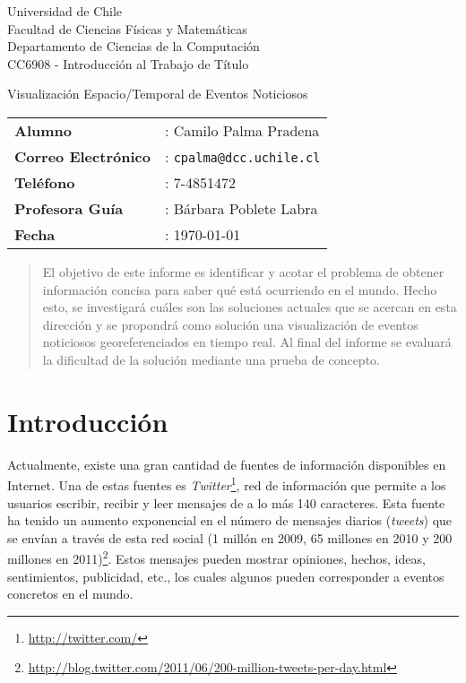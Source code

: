 \documentclass[10pt]{article}
\begin{document}
	\begin{titlepage}
	\begin{minipage}{12cm}
	\begin{flushleft}
	Universidad de Chile\\
	Facultad de Ciencias Físicas y Matemáticas\\
	Departamento de Ciencias de la Computación\\
	CC6908 - Introducción al Trabajo de Título
	\end{flushleft}
	\end{minipage}
	\vfill
	\begin{center}
	\huge Visualización Espacio/Temporal de Eventos Noticiosos
	\end{center}
	\vfill
	\begin{flushright}
		\begin{tabular}{ll}
		\bf{Alumno} & :  Camilo Palma Pradena\\ 
		\bf{Correo Electrónico} & :   \texttt{cpalma@dcc.uchile.cl}\\
		\bf{Teléfono} & :  7-4851472\\
		\bf{Profesora Guía} & :  Bárbara Poblete Labra\\
		\bf{Fecha} & :  \today\\

		\end{tabular}
	\end{flushright}
	\end{titlepage}

\begin{abstract}
El objetivo de este informe es identificar y acotar el problema de obtener información concisa para saber qué está ocurriendo en el mundo. Hecho esto, se investigará cuáles son las soluciones actuales que se acercan en esta dirección y se propondrá como solución una visualización de eventos noticiosos georeferenciados en tiempo real. Al final del informe se evaluará la dificultad de la solución mediante una prueba de concepto.

\end{abstract}

\section{Introducción}

Actualmente, existe una gran cantidad de fuentes de información disponibles en Internet. Una de estas fuentes es \emph{Twitter}\footnote{\url{http://twitter.com/}}, red de información que permite a los usuarios escribir, recibir y leer mensajes de a lo más 140 caracteres. Esta fuente ha tenido un aumento exponencial en el número de mensajes diarios (\emph{tweets}) que se envían a través de esta red social (1 millón en 2009, 65 millones en 2010 y 200 millones en 2011)\footnote{\url{http://blog.twitter.com/2011/06/200-million-tweets-per-day.html}}. Estos mensajes pueden mostrar opiniones, hechos, ideas, sentimientos, publicidad, etc., los cuales algunos pueden corresponder a eventos concretos en el mundo. 
\end{document}
